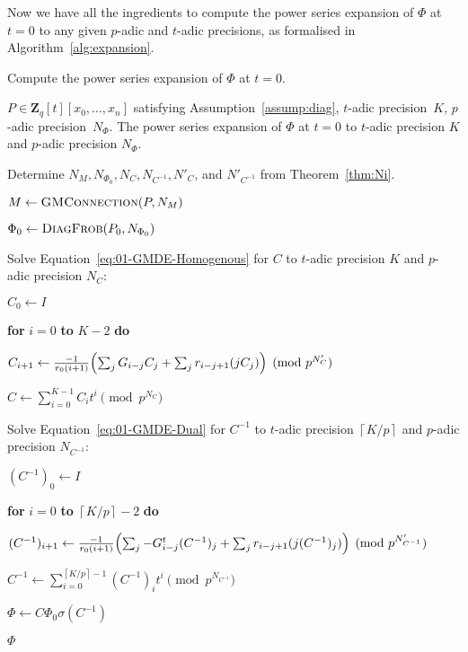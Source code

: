 \documentclass[a4paper,11pt]{article}
\numberwithin{equation}{section}
\providecommand{\ceil}[1]{\left\lceil#1\right\rceil}   %
\newcommand{\ZZ}{\mathbf{Z}} %
\theoremstyle{definition}
\begin{document}
Now we have all the ingredients to compute the power series expansion of 
$\Phi$ at $t=0$ to any given $p$-adic and $t$-adic precisions, as formalised 
in Algorithm~\ref{alg:expansion}.

\begin{algorithm}
\caption{Compute the power series expansion of $\Phi$ at $t=0$.}
\label{alg:expansion}
\begin{algorithmic}
\vspace{1mm}
\Require $P \in \ZZ_q[t][x_0,\dotsc,x_n]$ satisfying Assumption~\ref{assump:diag}, $t$-adic precision~$K$, $p$-adic precision~$N_{\Phi}$.
\Ensure  The power series expansion of $\Phi$ at $t=0$ to $t$-adic precision $K$ and $p$-adic precision $N_{\Phi}$.
\State \begin{compactenum}[{\hspace{6pt}} 1.] \vspace{-1.24em}
\item Determine $N_M,N_{\Phi_0},N_C,N_{C^{-1}},N'_C$, and $N'_{C^{-1}}$ from Theorem~\ref{thm:Ni}.
\item $M \gets \textsc{GMConnection}(P,N_M)$
\item $\Phi_0 \gets \textsc{DiagFrob}(P_0,N_{\Phi_0})$
\item Solve Equation~\eqref{eq:01-GMDE-Homogenous} for $C$ to $t$-adic precision $K$ and $p$-adic precision $N_{C}$:
\begin{compactenum}[a.] 
\item[] $C_0 \gets I$
\item[] \textbf{for} $i=0$ \textbf{to} $K-2$ \textbf{do} 
\item[] \hspace{0.6em} $C_{i+1} \gets \frac{-1}{r_0 (i+1)} \Bigl(\sum_j G_{i-j} C_j + \sum_j r_{i-j+1} (j C_j) \Bigr) \pmod{p^{N'_C}}$
\item[] $C \gets \sum_{i=0}^{K-1} C_i t^i \pmod{p^{N_C}}$
\end{compactenum}
\item Solve Equation~\eqref{eq:01-GMDE-Dual} for $C^{-1}$ to $t$-adic precision $\ceil{K/p}$ and $p$-adic precision $N_{C^{-1}}$:
\begin{compactenum}[a.]
\item[] $(C^{-1})_0 \gets I$
\item[] \textbf{for} $i=0$ \textbf{to} $\ceil{K/p}-2$ \textbf{do}
\item[] \hspace{0.6em} $(C^{-1})_{i+1} \gets  \frac{-1}{r_0(i+1)} \Bigl(\sum_j -G_{i-j}^t (C^{-1})_j + \sum_j r_{i-j+1} (j (C^{-1})_j) \Bigr) \pmod{p^{N'_{C^{-1}}}}$
\item[] $C^{-1} \gets \sum_{i=0}^{\ceil{K/p}-1} (C^{-1})_i t^{i} \pmod{p^{N_{C^{-1}}}}$
\end{compactenum}
\item $\Phi \gets C \Phi_0 \sigma(C^{-1})$
\item \Return $\Phi$
\end{compactenum}
\EndProcedure
\end{algorithmic}
\end{algorithm}
\end{document}
